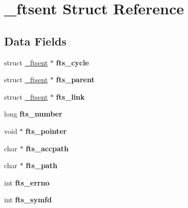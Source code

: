 \hypertarget{struct__ftsent}{}\section{\+\_\+ftsent Struct Reference}
\label{struct__ftsent}
\subsection*{Data Fields}
\begin{DoxyCompactItemize}
\item 
\mbox{\label{struct__ftsent_a98c3abfdddac7cce1209b813073f9c22}} 
struct \mbox{\hyperlink{struct__ftsent}{\+\_\+ftsent}} $\ast$ {\bfseries fts\+\_\+cycle}
\item 
\mbox{\label{struct__ftsent_a59a69daf4545cd4ef908c6f4f0939c4e}} 
struct \mbox{\hyperlink{struct__ftsent}{\+\_\+ftsent}} $\ast$ {\bfseries fts\+\_\+parent}
\item 
\mbox{\label{struct__ftsent_a387a9c3a2f1a485f774d67fcf5921ccc}} 
struct \mbox{\hyperlink{struct__ftsent}{\+\_\+ftsent}} $\ast$ {\bfseries fts\+\_\+link}
\item 
\mbox{\label{struct__ftsent_a1343b8378df80345ae70f42c00ade3c0}} 
long {\bfseries fts\+\_\+number}
\item 
\mbox{\label{struct__ftsent_adaac24ba63251611206460e5d26c57fd}} 
void $\ast$ {\bfseries fts\+\_\+pointer}
\item 
\mbox{\label{struct__ftsent_a0c8d43f657bdf9f7c9519918d4d2650a}} 
char $\ast$ {\bfseries fts\+\_\+accpath}
\item 
\mbox{\label{struct__ftsent_a82d9a0e5a5338c6d4c56e3277a504c0f}} 
char $\ast$ {\bfseries fts\+\_\+path}
\item 
\mbox{\label{struct__ftsent_acf923006d8c134110dab91dd49a40f0b}} 
int {\bfseries fts\+\_\+errno}
\item 
\mbox{\label{struct__ftsent_ad4a0d42bc311d6f0563c9accd96e88ef}} 
int {\bfseries fts\+\_\+symfd}
\item 

\end{DoxyCompactItemize}

